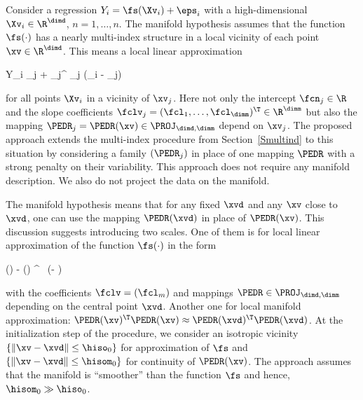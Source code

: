 
Consider a regression \( Y_{i} = \fs(\Xv_{i}) + \eps_{i} \) with a high-dimensional \( \Xv_{i} \in \R^{\dimd} \),
\( n = 1,\ldots,n \).
The manifold hypothesis assumes that the function \( \fs(\cdot) \) has a nearly multi-index structure in a local vicinity 
of each point \( \xv \in \R^{\dimd} \).
This means a local linear approximation
\begin{EQA}[c]
	\E Y_{i}
	\approx
	\fcn_{j} + \fclv_{j}^{\T} \PEDR_{j} (\Xv_{i} - \xv_{j})
\end{EQA}
for all points \( \Xv_{i} \) in a vicinity of \( \xv_{j} \).
Here not only the intercept \( \fcn_{j} \in \R \) and 
the slope coefficients \( \fclv_{j} = (\fcl_{1},\ldots,\fcl_{\dimm})^{\T} \in \R^{\dimm} \)
but also the mapping \( \PEDR_{j} = \PEDR(\xv) \in \PROJ_{\dimd,\dimm} \)
depend on \( \xv_{j} \).
%
The proposed approach extends the multi-index procedure from Section~\ref{Smultind} to this situation 
by considering a family \( (\PEDR_{j}) \) in place of one mapping \( \PEDR \) with a strong penalty on their variability.
This approach does not require any manifold description.
We also do not project the data on the manifold.

The manifold hypothesis means that for any fixed \( \xvd \) and any \( \xv \) close to \( \xvd \), 
one can use the mapping \( \PEDR(\xvd) \) in place of \( \PEDR(\xv) \). 
%
This discussion suggests introducing two scales.
One of them is for local linear approximation of the function \( \fs(\cdot) \) in the form
\begin{EQA}[c]
	\fs(\xv) - \fs(\xvd)
	\approx
	\fclv^{\T} \, \PEDR (\xv - \xvd) 
\end{EQA} 
with the coefficients \( \fclv = (\fcl_{m}) \) and mappings \( \PEDR \in \PROJ_{\dimd,\dimm} \) depending
on the central point \( \xvd \).
Another one for local manifold approximation:  
\(
	\PEDR(\xv)^{\T} \PEDR(\xv)
	\approx
	\PEDR(\xvd)^{\T} \PEDR(\xvd)
\).
At the initialization step of the procedure, we consider an isotropic vicinity
\( \{ \| \xv - \xvd \| \leq \hiso_{0} \} \) for approximation of \( \fs \)
and \( \{ \| \xv - \xvd \| \leq \hisom_{0} \} \) for continuity of \( \PEDR(\xv) \).
The approach assumes that the manifold is ``smoother'' than the function \( \fs \) and hence,
\( \hisom_{0} \gg \hiso_{0} \).

